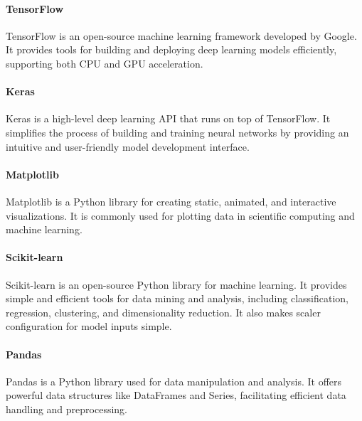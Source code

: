 \paragraph{TensorFlow} TensorFlow is an open-source machine learning framework developed by Google. It provides tools for building and deploying deep learning models efficiently, supporting both CPU and GPU acceleration.

\paragraph{Keras} Keras is a high-level deep learning API that runs on top of TensorFlow. It simplifies the process of building and training neural networks by providing an intuitive and user-friendly model development interface.

\paragraph{Matplotlib} Matplotlib is a Python library for creating static, animated, and interactive visualizations. It is commonly used for plotting data in scientific computing and machine learning.

\paragraph{Scikit-learn} Scikit-learn is an open-source Python library for machine learning. It provides simple and efficient tools for data mining and analysis, including classification, regression, clustering, and dimensionality reduction. It also makes scaler configuration for model inputs simple.

\paragraph{Pandas} Pandas is a Python library used for data manipulation and analysis. It offers powerful data structures like DataFrames and Series, facilitating efficient data handling and preprocessing.

